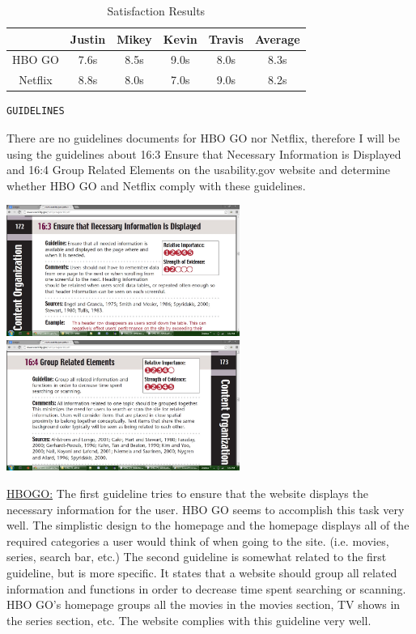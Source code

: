 \documentclass[11pt]{article}
\begin{document}
\begin{table}[ht]
\caption{Satisfaction Results} 				%
\centering 									%
\begin{tabular}{|c|c c c c|c|} %
\hline\hline 									%
   &Justin& Mikey&Kevin&Travis&Average  \\ [0.5ex] 	    %
\hline 									    %
HBO GO  &7.6s & 8.5s&9.0s&8.0s&8.3s          \\			 %
\hline
Netflix &8.8s&8.0s&7.0s&9.0s&8.2s                             \\ [0.5ex]
\hline
\end{tabular}
\label{table:nonlin} %
\end{table}

\begin{verbatim}
GUIDELINES
\end{verbatim}
There are no guidelines documents for HBO GO nor Netflix, therefore I will be using the guidelines about 16:3 Ensure that Necessary Information is Displayed and 16:4 Group Related Elements on the usability.gov website and determine whether HBO GO and Netflix comply with these guidelines.


\includegraphics[width=3in]{16_3_EnsureNecessaryInfo.jpg}
\includegraphics[width=3in]{16_4_GroupRelatedElements.jpg}


\underline{HBOGO:}
 The first guideline tries to ensure that the website displays the necessary information for the user. HBO GO seems to accomplish this task very well. The simplistic design to the homepage and the homepage displays all of the required categories a user would think of when going to the site. (i.e. movies, series, search bar, etc.) The second guideline is somewhat related to the first guideline, but is more specific. It states that a website should group all related information and functions in order to decrease time spent searching or scanning. HBO GO's homepage groups all the movies in the movies section, TV shows in the series section, etc. The website complies with this guideline very well.
\end{document}
